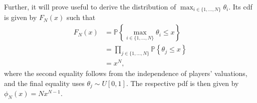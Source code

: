 \documentclass[a4paper]{article}
\begin{document}
Further, it will prove useful to derive the distribution of $\max_{i \in \{1,...,N\}} \theta_i$. Its cdf is given by $F_N(x)$ such that
\begin{equation} \label{eq:auc_Fmax}
\begin{aligned}
	F_{N}(x) 
	&= \mathbb{P} \left\{ \max_{i \in \{1,...,N\}} \theta_i \leq x \right\}
	\\
	&= \prod_{j \in \{1,...,N\}} \mathbb{P} \left\{ \theta_j \leq x \right\}
	\\
	&= x^N,
\end{aligned}
\end{equation}
where the second equality follows from the independence of players' valuations, and the final equality uses $\theta_j \sim U[0,1]$. The respective pdf is then given by $\phi_{N}(x) = Nx^{N-1}$.
\end{document}
